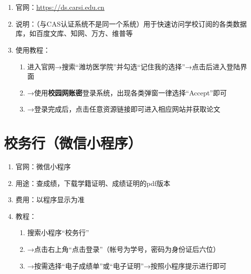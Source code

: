 \section[CARSI系统]{\textbf{}}
\label{carsi_system}
\begin{enumerate}
      \item 官网：\uline{\href{https://ds.carsi.edu.cn}{https://ds.carsi.edu.cn}}
      \item 说明：（与CAS认证系统不是同一个系统）用于快速访问学校订阅的各类数据库，如百度文库、知网、万方、维普等
      \item 使用教程：
            \begin{enumerate}
                  \item 进入官网→搜索“潍坊医学院”并勾选“记住我的选择”→点击后进入登陆界面\footnotemark
                  \item →使用\textbf{校园网账密}登录系统，出现各类弹窗一律选择“Accept”即可\footnotemark
                  \item →登录完成后，点击任意资源链接即可进入相应网站并获取论文
            \end{enumerate}
\end{enumerate}

\section[校务行（微信小程序）]{校务行（微信小程序）}
\label{cert_prover}
\begin{enumerate}
      \item 官网：微信小程序
      \item 用途：查成绩，下载学籍证明、成绩证明的pdf版本
      \item 费用：以程序显示为准
      \item 教程：
            \begin{enumerate}
                  \item 搜索小程序“校务行”
                  \item →点击右上角“点击登录”（帐号为学号，密码为身份证后六位）\footnotemark
                  \item →按需选择“电子成绩单”或“电子证明”→按照小程序提示进行即可
            \end{enumerate}
\end{enumerate}

